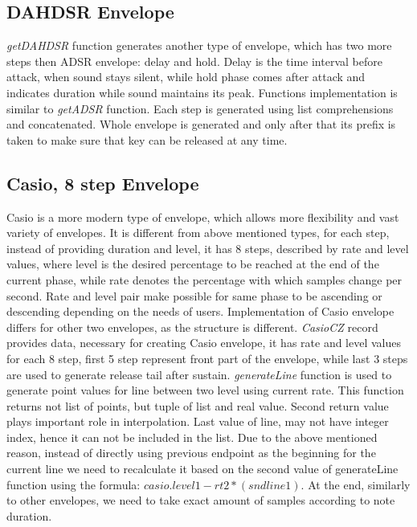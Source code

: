 \documentclass[12pt, a4paper]{article}
\begin{document}
\subsection{DAHDSR Envelope}

\textit{getDAHDSR} function generates another type of envelope, which has two more steps then ADSR envelope: delay and hold. Delay is the time interval before attack, when sound stays silent, while hold phase comes after attack and indicates duration while sound maintains its peak. Functions implementation is similar to \textit{getADSR} function. Each step is generated using list comprehensions and concatenated. Whole envelope is generated and only after that its prefix is taken to make sure that key can be released at any time.

\subsection{Casio, 8 step Envelope}

Casio is a more modern type of envelope, which allows more flexibility and vast variety of envelopes. It is different from above mentioned types, for each step, instead of providing duration and level, it has 8 steps, described by rate and level values, where level is the desired percentage to be reached at the end of the current phase, while rate denotes the percentage with which samples change per second. Rate and level pair make possible for same phase to be ascending or descending depending on the needs of users. Implementation of Casio envelope differs for other two envelopes, as the structure is different. \textit{CasioCZ} record provides data, necessary for creating Casio envelope, it has rate and level values for each 8 step, first 5 step represent front part of the envelope, while last 3 steps are used to generate release tail after sustain. \textit{generateLine} function is used to generate point values for line between two level using current rate. This function returns not  list of points, but tuple of list and real value. Second return value plays important role in interpolation. Last value of line, may not have integer index, hence it can not be included in the list. Due to the above mentioned reason, instead of directly using previous endpoint as the beginning for the current line we need to recalculate it based on the second value of generateLine function using the formula: \(casio.level1-rt2*(snd  line1)\). At the end, similarly to other envelopes, we need to take exact amount of samples according to note duration.
\end{document}
